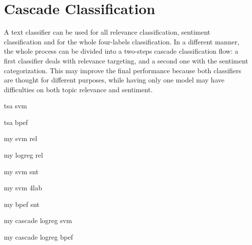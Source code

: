 \section{Cascade Classification}

A text classifier can be used for all relevance classification, sentiment classification and for the whole four-labels classification. In a different manner, the whole process can be divided into a two-steps cascade classification flow: a first classifier deals with relevance targeting, and a second one with the sentiment categorization. This may improve the final performance because both classifiers are thought for different purposes, while having only one model may have difficulties on both topic relevance and sentiment.















tsa svm

tsa bpef

my svm rel

my logreg rel

my svm snt

my svm 4lab

my bpef snt

my cascade logreg svm

my cascade logreg bpef



